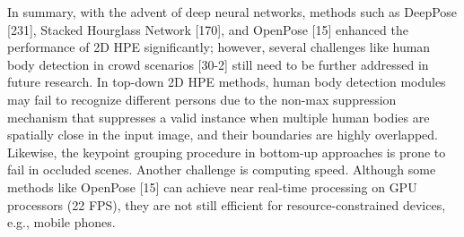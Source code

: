 In summary, with the advent of deep neural networks, methods such as DeepPose [231], Stacked Hourglass Network [170], and OpenPose [15] enhanced the performance of 2D HPE significantly; however, several challenges like human body detection in crowd scenarios [30-2] still need to be further addressed in future research. In top-down 2D HPE methods, human body detection modules may fail to recognize different persons due to the non-max suppression mechanism that suppresses a valid instance when multiple human bodies are spatially close in the input image, and their boundaries are highly overlapped. Likewise, the keypoint grouping procedure in bottom-up approaches is prone to fail in occluded scenes. Another challenge is computing speed. Although some methods like OpenPose [15] can achieve near real-time processing on GPU processors (22 FPS), they are not still efficient for resource-constrained devices, e.g., mobile phones.